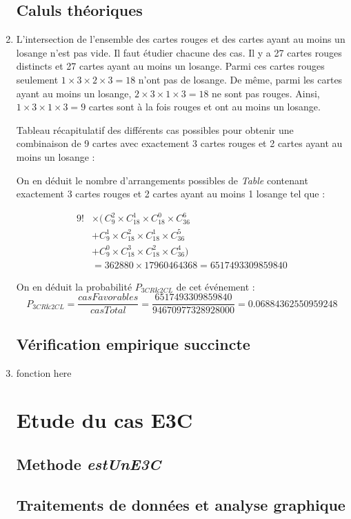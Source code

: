 \documentclass{report}
\begin{document}
\begin{enumerate}
\subsection{Caluls théoriques}
	\item L'intersection de l'ensemble des cartes rouges et des cartes ayant au moins un losange n'est pas vide. Il faut étudier chacune des cas. Il y a 27 cartes rouges distincts et 27 cartes ayant au moins un losange. Parmi ces cartes rouges seulement $1\times3\times2\times3=18$ n'ont pas de losange. De même, parmi les cartes ayant au moins un losange, $2\times3\times1\times3=18$ ne sont pas rouges. Ainsi, $1\times3\times1\times3=9$ cartes sont à la fois rouges et ont au moins un losange. 
\bigskip
\begin{table}[H]

\caption{Tableau récapitulatif des différents cas possibles pour obtenir une combinaison de 9 cartes avec exactement 3 cartes rouges et 2 cartes ayant au moins un losange :}
\end{table}



\bigskip
On en déduit le nombre d'arrangements possibles de \textit{Table} contenant exactement 3 cartes rouges et 2 cartes ayant au moins 1 losange tel que :

\begin{align*}
9! &\times(\,C^{2}_{9} \times C^{1}_{18} \times C^{0}_{18} \times C^{6}_{36} \\
&+C^{1}_{9} \times C^{2}_{18} \times C^{1}_{18} \times C^{5}_{36} \\
&+C^{0}_{9} \times C^{3}_{18} \times C^{2}_{18} \times C^{4}_{36} )\, \\
&= 362880 \times 17960464368 = 6517493309859840
\end{align*}

On en déduit la probabilité $P_{3CR\&2CL}$ de cet événement :
	$$P_{3CR\&2CL} = \dfrac{casFavorables}{casTotal} = \dfrac{6517493309859840}{94670977328928000} = 0.06884362550959248 $$


\subsection{Vérification empirique succincte}
\item fonction here

\section{Etude du cas E3C}

\subsection{Methode \textit{estUnE3C}}
\subsection{Traitements de données et analyse graphique}


\end{enumerate}
\end{document}
